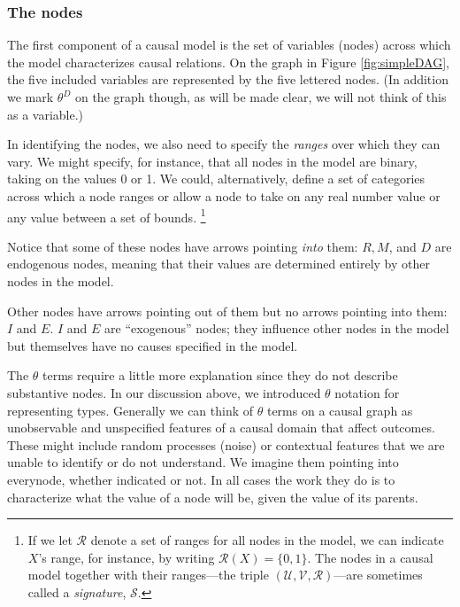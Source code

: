 \documentclass[
  12pt,
]{book}
\begin{document}
\hypertarget{the-nodes}{%
\subsubsection{The nodes}\label{the-nodes}}

The first component of a causal model is the set of variables (nodes) across which the model characterizes causal relations. On the graph in Figure \ref{fig:simpleDAG}, the five included variables are represented by the five lettered nodes. (In addition we mark \(\theta^D\) on the graph though, as will be made clear, we will not think of this as a variable.)

In identifying the nodes, we also need to specify the \emph{ranges} over which they can vary. We might specify, for instance, that all nodes in the model are binary, taking on the values 0 or 1. We could, alternatively, define a set of categories across which a node ranges or allow a node to take on any real number value or any value between a set of bounds. \footnote{If we let \(\mathcal{R}\) denote a set of ranges for all nodes in the model, we can indicate \(X\)'s range, for instance, by writing \(\mathcal{R}(X)=\{0,1\}\). The nodes in a causal model together with their ranges---the triple \((\mathcal{U}, \mathcal{V}, \mathcal{R})\)---are sometimes called a \emph{signature}, \(\mathcal{S}\).}

Notice that some of these nodes have arrows pointing \emph{into} them: \(R, M\), and \(D\) are endogenous nodes, meaning that their values are determined entirely by other nodes in the model.

Other nodes have arrows pointing out of them but no arrows pointing into them: \(I\) and \(E\). \(I\) and \(E\) are ``exogenous'' nodes; they influence other nodes in the model but themselves have no causes specified in the model.

The \(\theta\) terms require a little more explanation since they do not describe substantive nodes. In our discussion above, we introduced \(\theta\) notation for representing types. Generally we can think of \(\theta\) terms on a causal graph as unobservable and unspecified features of a causal domain that affect outcomes. These might include random processes (noise) or contextual features that we are unable to identify or do not understand. We imagine them pointing into everynode, whether indicated or not. In all cases the work they do is to characterize what the value of a node will be, given the value of its parents.
\end{document}
